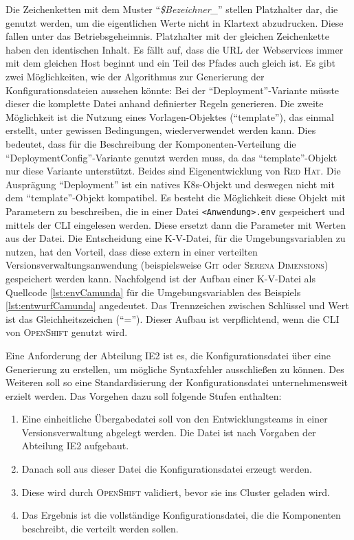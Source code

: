 Die Zeichenketten mit dem Muster \enquote{\textit{\$Bezeichner\_}} stellen Platzhalter dar, die genutzt werden, um die eigentlichen Werte nicht in Klartext abzudrucken. Diese fallen unter das Betriebsgeheimnis. Platzhalter mit der gleichen Zeichenkette haben den identischen Inhalt. Es fällt auf, dass die \ac{URL} der Webservices immer mit dem gleichen Host beginnt und ein Teil des Pfades auch gleich ist. Es gibt zwei Möglichkeiten, wie der Algorithmus zur Generierung der Konfigurationsdateien aussehen könnte: Bei der \enquote{Deployment}-Variante müsste dieser die komplette Datei anhand definierter Regeln generieren. Die zweite Möglichkeit ist die Nutzung eines Vorlagen-Objektes (\enquote{template}), das einmal erstellt, unter gewissen Bedingungen, wiederverwendet werden kann. Dies bedeutet, dass für die Beschreibung der Komponenten-Verteilung die \enquote{DeploymentConfig}-Variante genutzt werden muss, da das \enquote{template}-Objekt nur diese Variante unterstützt. Beides sind Eigenentwicklung von \textsc{Red Hat}. Die Ausprägung \enquote{Deployment} ist ein natives \ac{K8s}-Objekt und deswegen nicht mit dem \enquote{template}-Objekt kompatibel. Es besteht die Möglichkeit diese Objekt mit Parametern zu beschreiben, die in einer Datei \lstinline|<Anwendung>.env| gespeichert und mittels der \ac{CLI} eingelesen werden. Diese ersetzt dann die Parameter mit Werten aus der Datei. Die Entscheidung eine \ac{K-V}-Datei, für die Umgebungsvariablen zu nutzen, hat den Vorteil, dass diese extern in einer verteilten Versionsverwaltungsanwendung (beispielsweise \textsc{Git} oder \textsc{Serena Dimensions}) gespeichert werden kann. Nachfolgend ist der Aufbau einer \ac{K-V}-Datei als Quellcode \vref{lst:envCamunda} für die Umgebungsvariablen des Beispiels \vref{lst:entwurfCamunda} angedeutet. Das Trennzeichen zwischen Schlüssel und Wert ist das Gleichheitszeichen (\enquote{=}). Dieser Aufbau ist verpflichtend, wenn die \ac{CLI} von \textsc{OpenShift} genutzt wird.



Eine Anforderung der Abteilung \ac{IE2} ist es, die Konfigurationsdatei über eine Generierung zu erstellen, um mögliche Syntaxfehler ausschließen zu können. Des Weiteren soll so eine Standardisierung der Konfigurationsdatei unternehmensweit erzielt werden. Das Vorgehen dazu soll folgende Stufen enthalten: 


\begin{enumerate}
	\item Eine einheitliche Übergabedatei soll von den Entwicklungsteams in einer Versionsverwaltung abgelegt werden. Die Datei ist nach Vorgaben der Abteilung \ac{IE2} aufgebaut.
	\item Danach soll aus dieser Datei die Konfigurationsdatei erzeugt werden.
	\item Diese wird durch \textsc{OpenShift} validiert, bevor sie ins Cluster geladen wird.
	\item Das Ergebnis ist die vollständige Konfigurationsdatei, die die Komponenten beschreibt, die verteilt werden sollen.
\end{enumerate}

